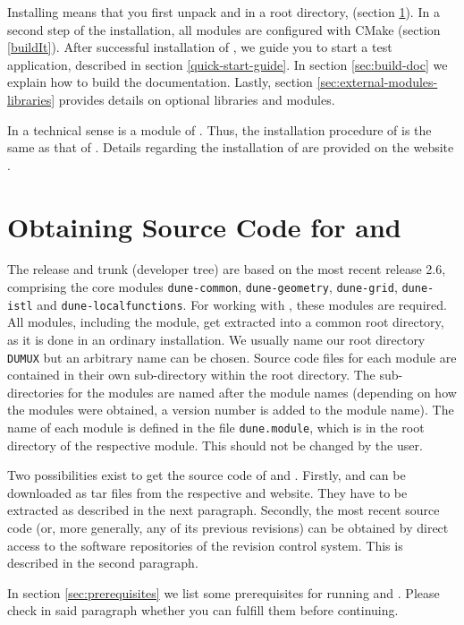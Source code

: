 Installing \Dumux means that you first unpack \Dune and \Dumux in a root directory,
(section \ref{sc:ObtainingSourceCode}).
In a second step of the installation, all modules are configured with CMake
(section \ref{buildIt}).
After successful installation of \Dumux, we guide you to start a test application,
described in section \ref{quick-start-guide}.
In section \ref{sec:build-doc} we explain how to build the \Dumux documentation.
Lastly, section \ref{sec:external-modules-libraries} provides details on optional libraries and modules.

In a technical sense \Dumux is a module of \Dune.
Thus, the installation procedure of \Dumux is the same as that of \Dune.
Details regarding the installation of \Dune are provided on the \Dune website \cite{DUNE-HP}.


\section{Obtaining Source Code for \Dune and \Dumux}
\label{sc:ObtainingSourceCode}
The \Dumux release and trunk (developer tree) are based on the most recent
\Dune release 2.6, comprising the core modules \texttt{dune-common}, \texttt{dune-geometry},
\texttt{dune-grid}, \texttt{dune-istl} and \texttt{dune-localfunctions}.
For working with \Dumux, these modules are required.
All \Dune modules, including the \Dumux module, get extracted into a common root directory, as it
is done in an ordinary \Dune installation.
We usually name our root directory \texttt{DUMUX} but an arbitrary name can be chosen.
Source code files for each \Dune module are contained in their own sub-directory within the root directory.
The sub-directories for the modules are named after the module names (depending on how
the modules were obtained, a version number is added to the module name).
The name of each \Dune module is defined in the file \texttt{dune.module}, which is
in the root directory of the respective module. This should not be changed by the user.

Two possibilities exist to get the source code of \Dune and \Dumux.
Firstly, \Dune and \Dumux can be downloaded as tar files from the respective \Dune and \Dumux website.
They have to be extracted as described in the next paragraph.
Secondly, the most recent source code
(or, more generally, any of its previous revisions) can be obtained by direct access
to the software repositories of the revision control system. This is described in the second paragraph.

In section \ref{sec:prerequisites} we list some prerequisites for running \Dune and \Dumux.
Please check in said paragraph whether you can fulfill them before continuing.

